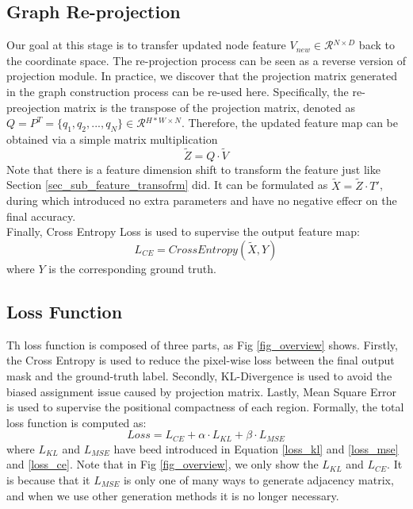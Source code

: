 ﻿\documentclass[journal]{IEEEtran}
\begin{document}
  
\subsection{Graph Re-projection}  
 
    Our goal at this stage is to transfer updated node feature $V_{new}\in\mathcal{R}{^{N\times D}}$ back to the coordinate space. The re-projection process can be seen as a reverse version of projection module. In practice, we discover that the projection matrix generated in the graph construction process can be re-used here. Specifically, the re-preojection matrix is the transpose of the projection matrix, denoted as  $Q=P^T=\{q_1, q_2, ..., q_N \}\in \mathcal{R}{^{H*W \times N}}$. Therefore, the updated feature map can be obtained via a simple matrix multiplication
    \begin{equation}
        \tilde{Z}={Q} \cdot \tilde{V}
    \end{equation}
    Note that there is a feature dimension shift to transform the feature just like Section \ref{sec_sub_feature_transofrm} did. It can be formulated as $\tilde{X} = \tilde{Z} \cdot T'$, during which introduced no extra parameters and have no negative effecr on the final accuracy. \\   


 
    Finally, Cross Entropy Loss is used to supervise the output feature map:
    \begin{equation}\label{loss_ce}
        L_{CE} = CrossEntropy(\tilde{X}, Y)
    \end{equation}
    where $Y$ is the corresponding ground truth.

\subsection{Loss Function}  
 
    Th loss function is composed of three parts, as Fig \ref{fig_overview} shows. Firstly, the Cross Entropy is used to reduce the pixel-wise loss between the final output mask and the ground-truth label. Secondly, KL-Divergence is used to avoid the biased assignment issue caused by projection matrix. Lastly, Mean Square Error is used to supervise the positional compactness of each region. Formally, the total loss function is computed as:
    \begin{equation}
        Loss =  L_{CE} + \alpha  \cdot L_{KL} + \beta \cdot L_{MSE}
    \end{equation}
    where $L_{KL}$ and $L_{MSE}$ have beed introduced in Equation \ref{loss_kl} and \ref{loss_mse} and \ref{loss_ce}. Note that in Fig \ref{fig_overview}, we only show the $L_{KL}$ and $L_{CE}$. It is because that it $L_{MSE}$ is only one of many ways to generate adjacency matrix, and when we use other generation methods it is no longer necessary.  \\     
\end{document}
